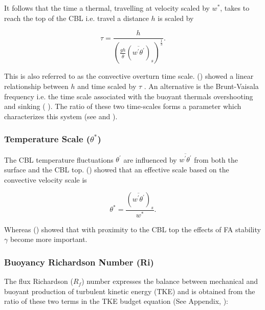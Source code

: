 It follows that the time a thermal, travelling at velocity scaled by $w^{*}$, takes to reach the top of the \acs{CBL} i.e. travel a distance $h$ is scaled by

\begin{equation}
\tau = \frac{h}{\left( \frac{gh}{\overline{\theta}}(\overline{w^{'}\theta^{'}})_{s} \right)^{\frac{1}{3}}}.
\end{equation}

 This is also referred to as the convective overturn time scale.  \citeauthor{SullMoengStev} (\citeyear{SullMoengStev}) 
showed a linear relationship between $h$ and time scaled by $\tau$ . An alternative is the Brunt-Vaisala frequency i.e. the time scale
 associated with the buoyant thermals overshooting and sinking (\citeauthor{FedConzMir04} \citeyear{FedConzMir04}).  The ratio of these two time-scales forms a parameter which characterizes this system (see \citeauthor{Sorbjan}\citeyear{Sorbjan} and \citeauthor{Deardorff79} \citeyear{Deardorff79}). 

\subsubsection{Temperature Scale ($\theta^{*}$)}
\label{subsubsec:}

The \acs{CBL} temperature fluctuations $\theta^{'}$ are influenced by $\overline{w^{'}\theta^{'}}$ from both the surface and the \acs{CBL} top.
\citeauthor {Deardorff70} (\citeyear{Deardorff70}) showed that an effective scale based on the convective velocity scale is

\begin{equation}
\theta^{*} = \frac{(\overline{w^{'}\theta^{'}})_{s}}{w^{*}}.
\end{equation} 

Whereas \citeauthor{Sorbjan} (\citeyear{Sorbjan}) showed that with proximity to the \acs{CBL} top the effects of \acs{FA} stability $\gamma$ become more important.
 
\subsubsection{Buoyancy Richardson Number (\acs{Ri})}
\label{subsubsec:}

The flux Richardson ($R_{f}$) number expresses the balance between mechanical and buoyant production of turbulent kinetic energy (\acs{TKE}) and is obtained from the ratio of these two terms in the \acs{TKE} budget equation (See Appendix, \citeauthor{Stull-BLMetIntro} \citeyear{Stull-BLMetIntro}):

